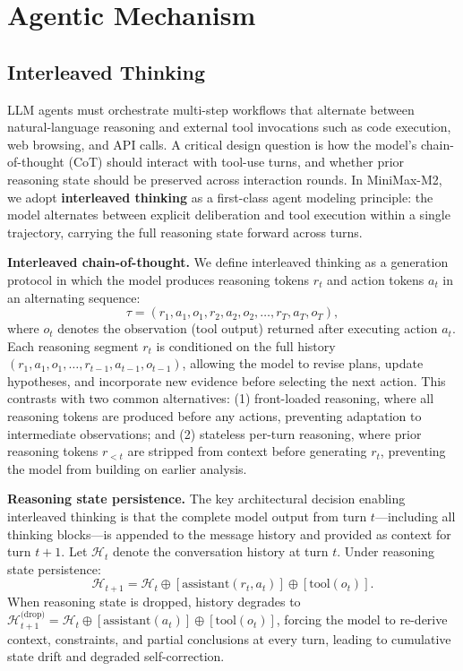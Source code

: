 \section{Agentic Mechanism}

\subsection{Interleaved Thinking}
\label{sec:interleaved-thinking}

LLM agents must orchestrate multi-step workflows that alternate between natural-language reasoning and external tool invocations such as code execution, web browsing, and API calls. A critical design question is how the model's chain-of-thought (CoT) should interact with tool-use turns, and whether prior reasoning state should be preserved across interaction rounds. In MiniMax-M2, we adopt \textbf{interleaved thinking} as a first-class agent modeling principle: the model alternates between explicit deliberation and tool execution within a single trajectory, carrying the full reasoning state forward across turns.

\noindent \textbf{Interleaved chain-of-thought.} We define interleaved thinking as a generation protocol in which the model produces reasoning tokens $r_t$ and action tokens $a_t$ in an alternating sequence:
\begin{equation}
\tau = (r_1, a_1, o_1, r_2, a_2, o_2, \ldots, r_T, a_T, o_T),
\end{equation}
where $o_t$ denotes the observation (tool output) returned after executing action $a_t$. Each reasoning segment $r_t$ is conditioned on the full history $(r_1, a_1, o_1, \ldots, r_{t-1}, a_{t-1}, o_{t-1})$, allowing the model to revise plans, update hypotheses, and incorporate new evidence before selecting the next action. This contrasts with two common alternatives: (1) front-loaded reasoning, where all reasoning tokens are produced before any actions, preventing adaptation to intermediate observations; and (2) stateless per-turn reasoning, where prior reasoning tokens $r_{<t}$ are stripped from context before generating $r_t$, preventing the model from building on earlier analysis.

\noindent \textbf{Reasoning state persistence.} The key architectural decision enabling interleaved thinking is that the complete model output from turn $t$---including all thinking blocks---is appended to the message history and provided as context for turn $t+1$. Let $\mathcal{H}_t$ denote the conversation history at turn $t$. Under reasoning state persistence:
\begin{equation}
\mathcal{H}_{t+1} = \mathcal{H}_t \oplus [\mathrm{assistant}(r_t, a_t)] \oplus [\mathrm{tool}(o_t)].
\end{equation}
When reasoning state is dropped, history degrades to $\mathcal{H}_{t+1}^{\text{(drop)}} = \mathcal{H}_t \oplus [\mathrm{assistant}(a_t)] \oplus [\mathrm{tool}(o_t)]$, forcing the model to re-derive context, constraints, and partial conclusions at every turn, leading to cumulative state drift and degraded self-correction.

